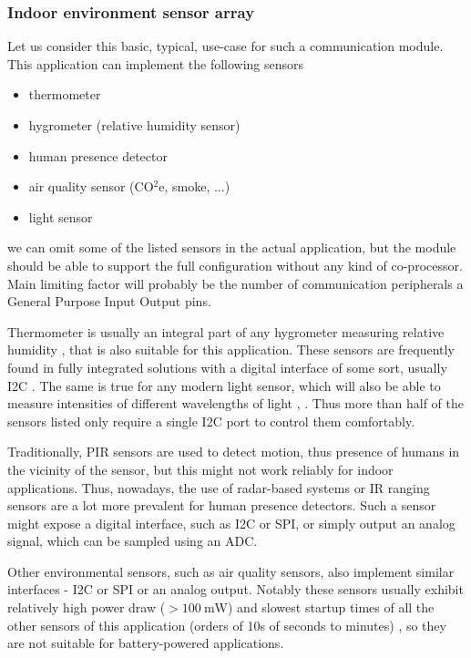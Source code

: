 \subsubsection{Indoor environment sensor array}
Let us consider this basic, typical, use-case for such a communication module. This application can implement the following sensors
\begin{itemize}
    \item thermometer
    \item hygrometer (relative humidity sensor)
    \item human presence detector
    \item air quality sensor (CO$^2$e, smoke, ...)
    \item light sensor
\end{itemize}
we can omit some of the listed sensors in the actual application, but the module should be able to support the full configuration without any kind of co-processor. Main limiting factor will probably be the number of communication peripherals a General Purpose Input Output pins.

Thermometer is usually an integral part of any hygrometer measuring relative humidity \cite{webster_humidity_1998}, that is also suitable for this application. These sensors are frequently found in fully integrated solutions with a digital interface of some sort, usually I2C \cite{bosch_sensortec_gmbh_bst-bme280-ds002pdf_2024}. The same is true for any modern light sensor, which will also be able to measure intensities of different wavelengths of light \cite{stmicroelectronics_ambient_2024}, \cite{texas_instruments_inc_light_2024}. Thus more than half of the sensors listed only require a single I2C port to control them comfortably.

Traditionally, PIR sensors are used to detect motion, thus presence of humans in the vicinity of the sensor, but this might not work reliably for indoor applications. Thus, nowadays, the use of radar-based systems \cite{ag_presence_2024} or IR ranging sensors \cite{stmicroelectronics_human_2024} are a lot more prevalent for human presence detectors. Such a sensor might expose a digital interface, such as I2C or SPI, or simply output an analog signal, which can be sampled using an ADC.

Other environmental sensors, such as air quality sensors, also implement similar interfaces - I2C or SPI or an analog output. Notably these sensors usually exhibit relatively high power draw ($>100~\mathrm{mW}$) and slowest startup times of all the other sensors of this application (orders of 10s of seconds to minutes) \cite{amphenol_inc_mics-vz-89te_2024}, so they are not suitable for battery-powered applications.

